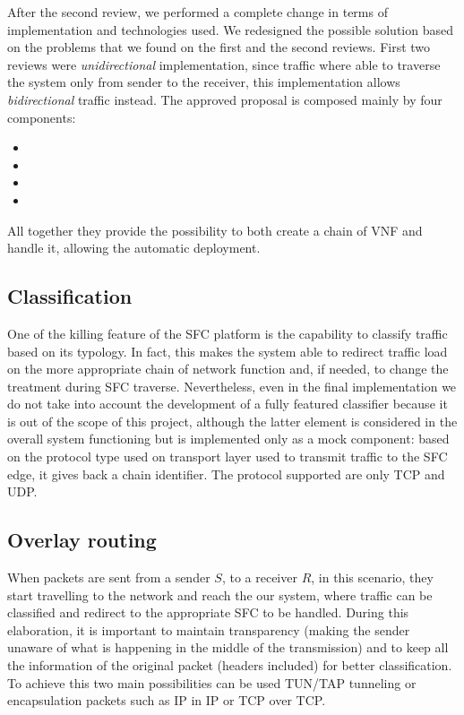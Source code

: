 After the second review, we performed a complete change in terms of
implementation and technologies used. We redesigned the possible solution based
on the problems that we found on the first and the second reviews. First two
reviews were \emph{unidirectional} implementation, since traffic where able
to traverse the system only from sender to the receiver, this implementation
allows \emph{bidirectional} traffic instead. The approved proposal is composed
mainly by four components:
\begin{itemize}
  \item \astaire{}
  \item \harbor{}
  \item \ironhide{}
  \item \roulette{}
\end{itemize}
All together they provide the possibility to both create a chain of VNF and
handle it, allowing the automatic deployment.

\subsection{Classification}
One of the killing feature of the SFC platform is the capability to classify
traffic based on its typology. In fact, this makes the system able to redirect
traffic load on the more appropriate chain of network function and, if needed,
to change the treatment during SFC traverse. Nevertheless, even in the final
implementation we do not take into account the development of a fully featured
classifier because it is out of the scope of this project, although the
latter element is considered in the overall system functioning but is
implemented only as a mock component: based on the protocol type used on
transport layer used to transmit traffic to the SFC edge, it gives back a
chain identifier. The protocol supported are only TCP and UDP.

\subsection{Overlay routing}
When packets are sent from a sender $S$, to a receiver $R$, in this scenario,
they start travelling to the network and reach the our system, where traffic can
be classified and redirect to the appropriate SFC to be handled. During this
elaboration, it is important to maintain transparency (making the sender unaware
of what is happening in the middle of the transmission) and to keep all the
information of the original packet (headers included) for better classification.
To achieve this two main possibilities can be used TUN/TAP tunneling or
encapsulation packets such as IP in IP or TCP over TCP.

